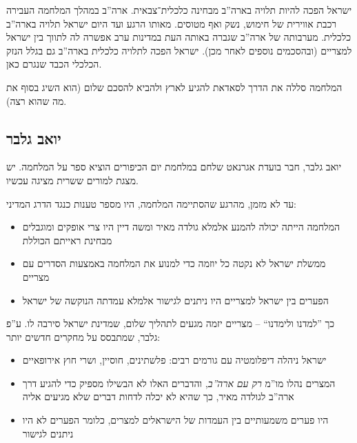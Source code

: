 \documentclass[]{../../../../tex/classes/styledArticle}
\begin{document}
	ישראל הפכה להיות תלויה בארה''ב מבחינה כלכלית־צבאית. ארה''ב במהלך המלחמה העבירה רכבת אווירית של חימוש, נשק ואף מטוסים. מאותו הרגע ועד היום ישראל תלויה בארה''ב כלכלית. מערבותה של ארה''ב שגברה באותה העת במדינות ערב אפשרה לה לתווך בין ישראל למצריים (ובהסכמים נוספים לאחר מכן). ישראל הפכה לתלויה כלכלית בארה''ב גם בגלל הנזק הכלכלי הכבד שנגרם כאן. 
	
	המלחמה סללה את הדרך לסאדאת להגיע לארץ ולהביא להסכם שלום (הוא השיג בסוף את מה שהוא רצה). 
	
	\subsection*{יואב גלבר}
	יואב גלבר, חבר בועדת אגרנאט שלחם במלחמת יום הכיפורים הוציא ספר על המלחמה. יש מצגת למורים ששרית מציגה עכשיו. 
	
	עד לא מזמן, מהרגע שהסתיימה המלחמה, היו מספר טענות כנגד הדרג המדיני: 
	\begin{itemize}
		\item המלחמה הייתה יכולה להמנע אלמלא גולדה מאיר ומשה דיין היו צרי אופקים ומוגבלים מבחינת ראייתם הכוללת
		\item ממשלת ישראל לא נקטה כל יוזמה כדי למנוע את המלחמה באמצעות הסדרים עם מצריים
		\item הפערים בין ישראל למצריים היו ניתנים לגישור אלמלא עמדתה הנוקשה של ישראל
	\end{itemize}
	כך ''למדנו ולימדנו`` – מצריים יזמה מגעים לתהליך שלום, שמדינת ישראל סירבה לו. ע''פ גלבר, שמתבסס על מחקרים חדשים יותר:
	
	\begin{itemize}
		\item ישראל ניהלה דיפלומטיה עם גורמים רבים: פלשתינים, חוסיין, ושרי חוץ אירופאיים
		\item המצרים נהלו מו''מ \textit{רק עם ארה''ב}, והדברים האלו לא הבשילו מספיק כדי להגיע דרך ארה''ב לגולדה מאיר, כך שהיא לא יכלה לדחות דברים שלא מגיעים אליה
		\item היו פערים משמעותיים בין העמדות של הישראלים למצרים, כלומר הפערים לא היו ניתנים לגישור
	\end{itemize}
	
\end{document}
